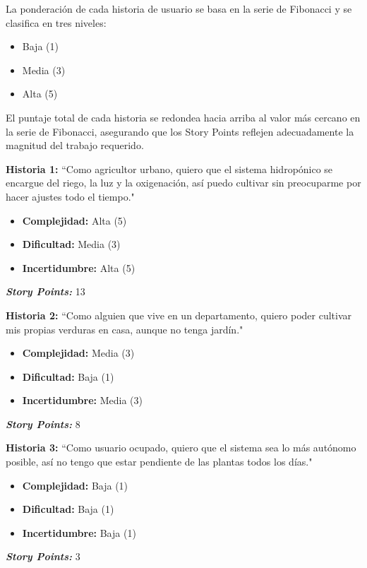 \documentclass[
11pt, %
]{charter}
\begin{document}
La ponderación de cada historia de usuario se basa en la serie de Fibonacci y se clasifica en tres niveles:

\begin{itemize}
    \item Baja (1)
    \item Media (3)
    \item Alta (5)
\end{itemize}

El puntaje total de cada historia se redondea hacia arriba al valor más cercano en la serie de Fibonacci, asegurando que los Story Points reflejen adecuadamente la magnitud del trabajo requerido.


\textbf{Historia 1:} ``Como agricultor urbano, quiero que el sistema hidropónico se encargue del riego, la luz y la oxigenación, así puedo cultivar sin preocuparme por hacer ajustes todo el tiempo."

        \begin{itemize}
            \item \textbf{Complejidad:} Alta (5)
            \item \textbf{Dificultad:} Media (3)
            \item \textbf{Incertidumbre:} Alta (5)
        \end{itemize}
        \textit{\textbf{Story Points:}} 13

\textbf{Historia 2:} ``Como alguien que vive en un departamento, quiero poder cultivar mis propias verduras en casa, aunque no tenga jardín."

        \begin{itemize}
            \item \textbf{Complejidad:} Media (3)
            \item \textbf{Dificultad:} Baja (1)
            \item \textbf{Incertidumbre:} Media (3)
        \end{itemize}
        \textit{\textbf{Story Points:}} 8

\textbf{Historia 3:} ``Como usuario ocupado, quiero que el sistema sea lo más autónomo posible, así no tengo que estar pendiente de las plantas todos los días."

        \begin{itemize}
            \item \textbf{Complejidad:} Baja (1)
            \item \textbf{Dificultad:} Baja (1)
            \item \textbf{Incertidumbre:} Baja (1)
        \end{itemize}
        \textit{\textbf{Story Points:}} 3
\end{document}
